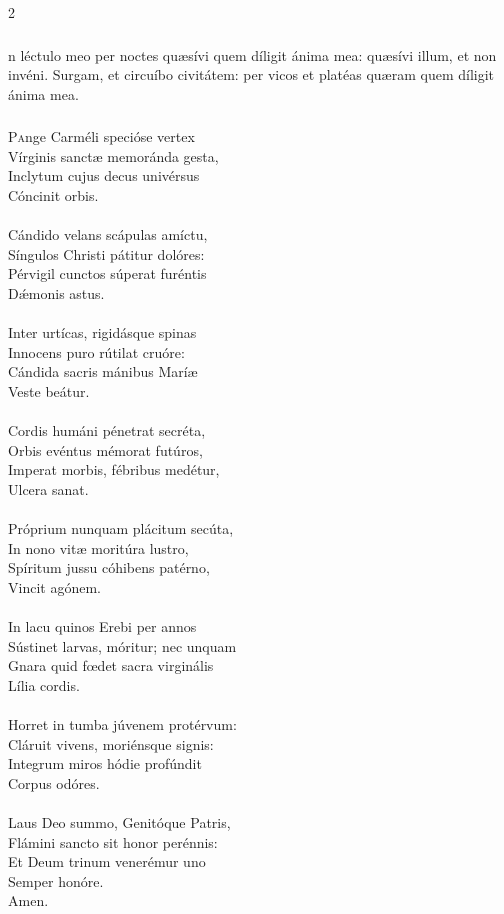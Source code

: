 \documentclass[9pt,twoside]{extarticle}
\begin{document}
\begin{multicols}{2}
\subsubsection*{}
n léctulo meo per noctes quæsívi quem díligit ánima mea: quæsívi illum, et non invéni. Surgam, et circuíbo civitátem: per vicos et platéas quæram quem díligit ánima mea.

\subsubsection*{\center {}}
\lettrine{P}ange Carméli specióse vertex\\
Vírginis sanctæ memoránda gesta,\\
Inclytum cujus decus univérsus\\
Cóncinit orbis.\\
\\
Cándido velans scápulas amíctu,\\
Síngulos Christi pátitur dolóres:\\
Pérvigil cunctos súperat furéntis\\
Dǽmonis astus.\\
\\
Inter urtícas, rigidásque spinas\\
Innocens puro rútilat cruóre:\\
Cándida sacris mánibus Maríæ\\
Veste beátur.\\
\\
Cordis humáni pénetrat secréta,\\
Orbis evéntus mémorat futúros,\\
Imperat morbis, fébribus medétur,\\
Ulcera sanat.\\
\\
Próprium nunquam plácitum secúta,\\
In nono vitæ moritúra lustro,\\
Spíritum jussu cóhibens patérno,\\
Vincit agónem.\\
\\
In lacu quinos Erebi per annos\\
Sústinet larvas, móritur; nec unquam\\
Gnara quid fœdet sacra virginális\\
Lília cordis.\\
\\
Horret in tumba júvenem protérvum:\\
Cláruit vivens, moriénsque signis:\\
Integrum miros hódie profúndit\\
Corpus odóres.\\
\\
Laus Deo summo, Genitóque Patris,\\
Flámini sancto sit honor perénnis:\\
Et Deum trinum venerémur uno\\
Semper honóre.\\
Amen.


\end{multicols}
\end{document}

